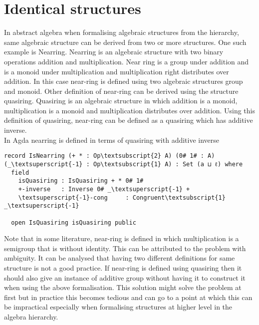 \section{Identical structures}
In abstract algebra when formalising algebraic structures from the hierarchy, same algebraic structure can be derived from two or more structures. One such example is Nearring. Nearring is an algebraic structure with two binary operations addition and multiplication. Near ring is a group under addition and is a monoid under multiplication and multiplication right distributes over addition. In this case near-ring is defined using two algebraic structures group and monoid. Other definition of near-ring can be derived using the structure quasiring. Quasiring is an algebraic structure in which addition is a monoid, multiplication is a monoid and multiplication distributes over addition. Using this definition of quasiring, near-ring can be defined as a quasiring which has additive inverse. \\
In Agda nearring is defined in terms of quasiring with additive inverse 
\begin{Verbatim}[commandchars=\\\{\}]
record IsNearring (+ * : Op\textsubscript{2} A) (0# 1# : A) (_\textsuperscript{-1} : Op\textsubscript{1} A) : Set (a ⊔ ℓ) where
  field
    isQuasiring : IsQuasiring + * 0# 1#
    +-inverse   : Inverse 0# _\textsuperscript{-1} +
    \textsuperscript{-1}-cong     : Congruent\textsubscript{1} _\textsuperscript{-1}

  open IsQuasiring isQuasiring public
\end{Verbatim}
Note that in some literature, near-ring is defined in which multiplication is a semigroup that is without identity. This can be attributed to the problem with ambiguity. It can be analysed that having two different definitions for same structure is not a good practice. If near-ring is defined using quasiring then it should also give an instance of additive group without having it to construct it when using the above formalisation. This solution might solve the problem at first but in practice this becomes tedious and can go to a point at which this can be impractical especially when formalising structures at higher level in the algebra hierarchy.

